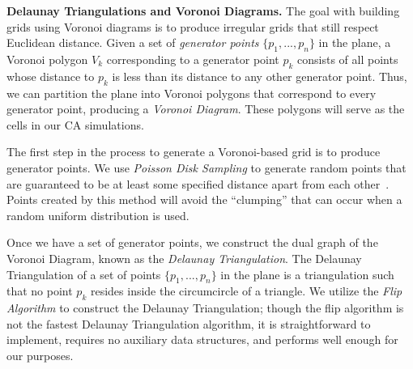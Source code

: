 \documentclass[a4paper,11pt]{article}
\begin{document}
\noindent \textbf{Delaunay Triangulations and Voronoi Diagrams.}
The goal with building grids using Voronoi diagrams is to produce irregular grids that still respect Euclidean distance. Given a set of \textit{generator points} $\{p_1, ..., p_n\}$ in the plane, a Voronoi polygon $V_k$ corresponding to a generator point $p_k$ consists of all points whose distance to $p_k$ is less than its distance to any other generator point. Thus, we can partition the plane into Voronoi polygons that correspond to every generator point, producing a \textit{Voronoi Diagram}. These polygons will serve as the cells in our CA simulations.

The first step in the process to generate a Voronoi-based grid is to produce generator points. We use \textit{Poisson Disk Sampling} to generate random points that are guaranteed to be at least some specified distance apart from each other~\cite{br07}. Points created by this method will avoid the ``clumping'' that can occur when a random uniform distribution is used.




Once we have a set of generator points, we construct the dual graph of the Voronoi Diagram, known as the \textit{Delaunay Triangulation}. The Delaunay Triangulation of a set of points $\{p_1, ..., p_n\}$ in the plane is a triangulation such that no point $p_k$ resides inside the circumcircle of a triangle. We utilize the \textit{Flip Algorithm} to construct the Delaunay Triangulation; though the flip algorithm is not the fastest Delaunay Triangulation algorithm, it is straightforward to implement, requires no auxiliary data structures, and performs well enough for our purposes.
\end{document}
